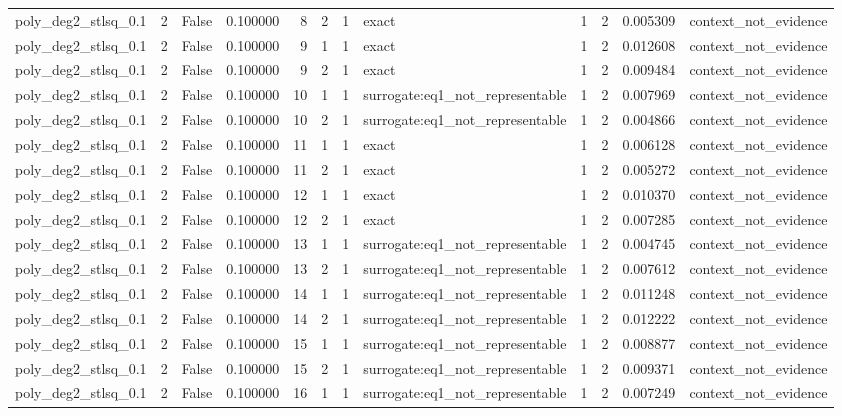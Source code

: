 \begin{tabular}{lrrrrrrlrrrl}
poly\_deg2\_stlsq\_0.1 & 2 & False & 0.100000 & 8 & 2 & 1 & exact & 1 & 2 & 0.005309 & context\_not\_evidence \\
poly\_deg2\_stlsq\_0.1 & 2 & False & 0.100000 & 9 & 1 & 1 & exact & 1 & 2 & 0.012608 & context\_not\_evidence \\
poly\_deg2\_stlsq\_0.1 & 2 & False & 0.100000 & 9 & 2 & 1 & exact & 1 & 2 & 0.009484 & context\_not\_evidence \\
poly\_deg2\_stlsq\_0.1 & 2 & False & 0.100000 & 10 & 1 & 1 & surrogate:eq1\_not\_representable & 1 & 2 & 0.007969 & context\_not\_evidence \\
poly\_deg2\_stlsq\_0.1 & 2 & False & 0.100000 & 10 & 2 & 1 & surrogate:eq1\_not\_representable & 1 & 2 & 0.004866 & context\_not\_evidence \\
poly\_deg2\_stlsq\_0.1 & 2 & False & 0.100000 & 11 & 1 & 1 & exact & 1 & 2 & 0.006128 & context\_not\_evidence \\
poly\_deg2\_stlsq\_0.1 & 2 & False & 0.100000 & 11 & 2 & 1 & exact & 1 & 2 & 0.005272 & context\_not\_evidence \\
poly\_deg2\_stlsq\_0.1 & 2 & False & 0.100000 & 12 & 1 & 1 & exact & 1 & 2 & 0.010370 & context\_not\_evidence \\
poly\_deg2\_stlsq\_0.1 & 2 & False & 0.100000 & 12 & 2 & 1 & exact & 1 & 2 & 0.007285 & context\_not\_evidence \\
poly\_deg2\_stlsq\_0.1 & 2 & False & 0.100000 & 13 & 1 & 1 & surrogate:eq1\_not\_representable & 1 & 2 & 0.004745 & context\_not\_evidence \\
poly\_deg2\_stlsq\_0.1 & 2 & False & 0.100000 & 13 & 2 & 1 & surrogate:eq1\_not\_representable & 1 & 2 & 0.007612 & context\_not\_evidence \\
poly\_deg2\_stlsq\_0.1 & 2 & False & 0.100000 & 14 & 1 & 1 & surrogate:eq1\_not\_representable & 1 & 2 & 0.011248 & context\_not\_evidence \\
poly\_deg2\_stlsq\_0.1 & 2 & False & 0.100000 & 14 & 2 & 1 & surrogate:eq1\_not\_representable & 1 & 2 & 0.012222 & context\_not\_evidence \\
poly\_deg2\_stlsq\_0.1 & 2 & False & 0.100000 & 15 & 1 & 1 & surrogate:eq1\_not\_representable & 1 & 2 & 0.008877 & context\_not\_evidence \\
poly\_deg2\_stlsq\_0.1 & 2 & False & 0.100000 & 15 & 2 & 1 & surrogate:eq1\_not\_representable & 1 & 2 & 0.009371 & context\_not\_evidence \\
poly\_deg2\_stlsq\_0.1 & 2 & False & 0.100000 & 16 & 1 & 1 & surrogate:eq1\_not\_representable & 1 & 2 & 0.007249 & context\_not\_evidence \\

\end{tabular}
